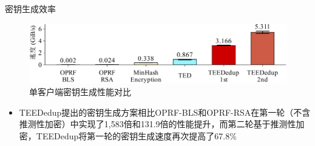 \documentclass{beamer}
\begin{document}
\begin{frame}{密钥生成效率}
    \begin{figure}[htpb]
        \centering
        \includegraphics[width=\linewidth]{../pic/sgxdedup/plot/exp_a2/expa2_keyGenPerformance.pdf}
        \caption{单客户端密钥生成性能对比}
    \end{figure}

    \begin{itemize}
        \item TEEDedup提出的密钥生成方案相比OPRF-BLS和OPRF-RSA在第一轮（不含推测性加密）中实现了1,583倍和131.9倍的性能提升，而第二轮基于推测性加密，TEEDedup将第一轮的密钥生成速度再次提高了67.8\%
    \end{itemize}
\end{frame}
\end{document}
